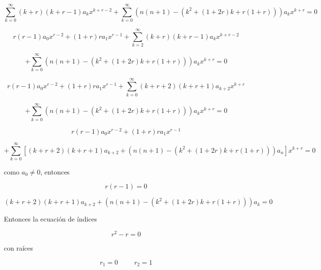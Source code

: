\documentclass[12pt,a4paper]{article}
\begin{document}
\begin{enumerate}
    \begin{equation*}
        \sum_{k=0}^{\infty} (k+r)(k+r-1)a_kx^{k+r-2}+\sum_{k=0}^{\infty} (n(n+1)-(k^2+(1+2r)k+r(1+r)))a_kx^{k+r}= 0
    \end{equation*}
    
    \begin{equation*}
        r(r-1)a_0 x^{r-2} +(1+r)ra_1 x^{r-1}+\sum_{k=2}^{\infty} (k+r)(k+r-1)a_kx^{k+r-2}
    \end{equation*}
    
    \begin{equation*}
        +\sum_{k=0}^{\infty}(n(n+1)-(k^2+(1+2r)k+r(1+r)))a_kx^{k+r}= 0
    \end{equation*}
    
    \begin{equation*}
        r(r-1)a_0 x^{r-2} +(1+r)ra_1 x^{r-1}+\sum_{k=0}^{\infty} (k+r+2)(k+r+1)a_{k+2}x^{k+r}
    \end{equation*}
    
    \begin{equation*}
        +\sum_{k=0}^{\infty}(n(n+1)-(k^2+(1+2r)k+r(1+r)))a_kx^{k+r}= 0
    \end{equation*}
    
    \begin{equation*}
        r(r-1)a_0 x^{r-2} +(1+r)ra_1 x^{r-1}
    \end{equation*}
    
    \begin{equation*}
        +\sum_{k=0}^{\infty}[ (k+r+2)(k+r+1)a_{k+2}+(n(n+1)-(k^2+(1+2r)k+r(1+r)))a_n]x^{k+r}= 0
    \end{equation*}
    
    
    como $a_0 \neq 0$, entonces
    
    \begin{equation*}
        r(r-1)=0
    \end{equation*}
    
    \begin{equation*}
        (k+r+2)(k+r+1)a_{k+2}+(n(n+1)-(k^2+(1+2r)k+r(1+r)))a_k = 0
    \end{equation*}
    
    Entonces la ecuación de índices
    
    \begin{equation*}
        r^2-r = 0
    \end{equation*}
    
    con raíces
    
    \begin{equation*}
        r_1 = 0 \hspace{1cm} r_2 = 1
    \end{equation*}
    

\end{enumerate}
\end{document}
